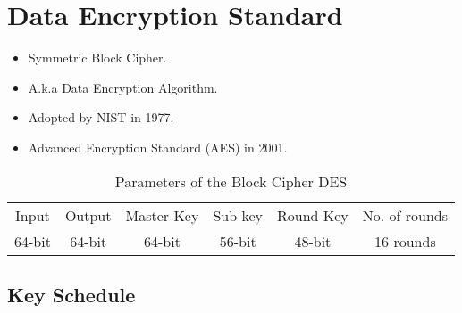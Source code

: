 \chapter{Data Encryption Standard}

\begin{itemize}
	\item Symmetric Block Cipher.
	\item A.k.a Data Encryption Algorithm.
	\item Adopted by NIST in 1977.
	\item Advanced Encryption Standard (AES) in 2001.
\end{itemize}

\begin{table}[h!]\centering\renewcommand{\arraystretch}{1.25} %
\caption{Parameters of the Block Cipher DES}
\begin{tabular*}{\textwidth}{@{\extracolsep{\fill}}cccccc}
	\toprule[1.2pt]
	Input & Output & Master Key & Sub-key & Round Key & No. of rounds \\
	64-bit & 64-bit & 64-bit & 56-bit & 48-bit & 16 rounds \\
	\bottomrule[1.2pt]
\end{tabular*}
\end{table}

\section{Key Schedule}

\newpage
